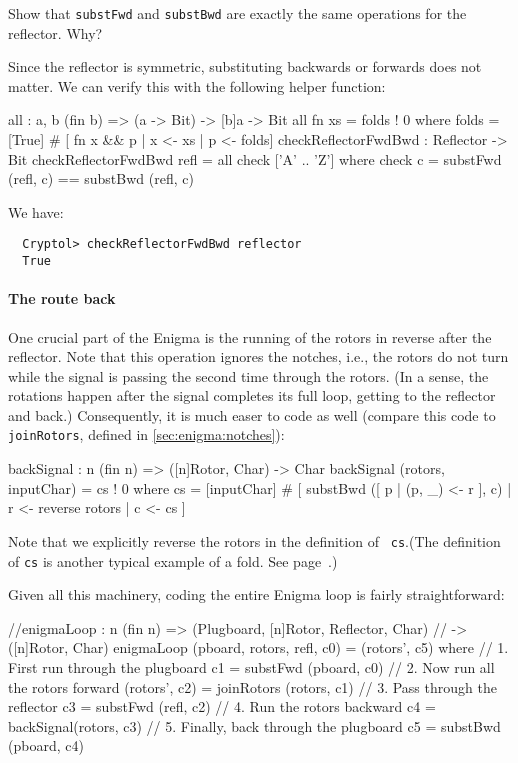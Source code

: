 \begin{Exercise}\label{ex:enigma:8}
  Show that {\tt substFwd} and {\tt substBwd} are exactly the same
  operations for the reflector. Why?
\end{Exercise}
\begin{Answer}
  Since the reflector is symmetric, substituting backwards or forwards
  does not matter. We can verify this with the following helper
  function:\indAll
\begin{code}
  all : {a, b} (fin b) => (a -> Bit) -> [b]a -> Bit
  all fn xs = folds ! 0 where
    folds = [True] # [ fn x && p | x <- xs
                                 | p <- folds]
  checkReflectorFwdBwd : Reflector -> Bit
  checkReflectorFwdBwd refl = all check ['A' .. 'Z']
    where check c = substFwd (refl, c) == substBwd (refl, c)
\end{code}
We have:
\begin{Verbatim}
  Cryptol> checkReflectorFwdBwd reflector
  True
\end{Verbatim}
\end{Answer}

\paragraph*{The route back} One crucial part of the Enigma is the
running of the rotors in reverse after the reflector. Note that this
operation ignores the notches, i.e., the rotors do not turn while the
signal is passing the second time through the rotors. (In a sense, the
rotations happen after the signal completes its full loop, getting to
the reflector and back.)  Consequently, it is much easer to code as
well (compare this code to {\tt joinRotors}, defined in
\autoref{sec:enigma:notches}):

\begin{code}
  backSignal : {n} (fin n) => ([n]Rotor, Char) -> Char
  backSignal (rotors, inputChar) = cs ! 0
    where 
      cs = [inputChar] # [  substBwd ([ p | (p, _) <- r ], c)
                          | r <- reverse rotors
                          | c <- cs
                         ]
\end{code}
Note that we explicitly reverse the rotors in the definition of {\tt
  cs}.\indReverse (The definition of {\tt cs} is another typical
example of a fold. See page~\pageref{par:fold}.)\indFold

Given all this machinery, coding the entire Enigma loop is fairly
straightforward:
\begin{code}
  //enigmaLoop : {n} (fin n) => (Plugboard, [n]Rotor, Reflector, Char)
  //                         -> ([n]Rotor, Char)
  enigmaLoop (pboard, rotors, refl, c0) = (rotors', c5)
    where
      // 1. First run through the plugboard
      c1 = substFwd (pboard, c0)
      // 2. Now run all the rotors forward
      (rotors', c2) = joinRotors (rotors, c1)
      // 3. Pass through the reflector
      c3 = substFwd (refl, c2)
      // 4. Run the rotors backward
      c4 = backSignal(rotors, c3)
      // 5. Finally, back through the plugboard
      c5 = substBwd (pboard, c4)
\end{code}

